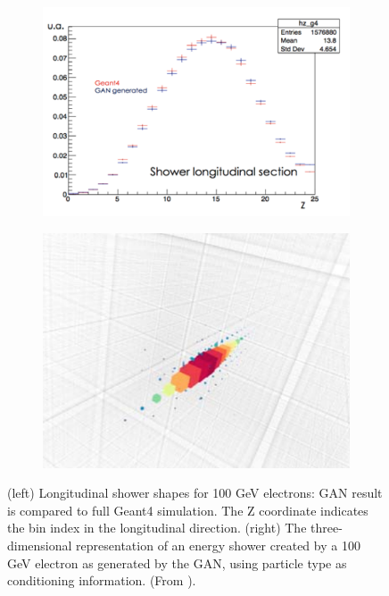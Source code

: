 \begin{figure}[h]
    \centering
    \begin{subfigure}[b]{0.54\textwidth}
    \centering
\includegraphics [width=\textwidth]{images/3dgan.png}
    \end{subfigure}
    \hfill
        \begin{subfigure}[b]{0.44\textwidth}
        \includegraphics [width=\textwidth]{images/3dgan1.png}

        \end{subfigure}
        \caption{(left) Longitudinal shower shapes for 100 GeV electrons: GAN result is compared to full Geant4
simulation. The Z coordinate indicates the bin index in the longitudinal direction. (right) The three-dimensional representation of an energy shower created by a 100
GeV electron as generated by the GAN, using particle type as conditioning information. (From \cite{3dgan}).}
        \label{fig:3dgan}

\end{figure}



